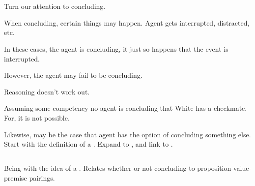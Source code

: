 \chapter{}
\label{cha:zS:sec:curbs}

\begin{note}
  Turn our attention to concluding.

  When concluding, certain things may happen.
  Agent gets interrupted, distracted, etc.

  In these cases, the agent is concluding, it just so happens that the event is interrupted.

  However, the agent may fail to be concluding.

  Reasoning doesn't work out.

  Assuming some competency no agent is concluding that White has a checkmate.
  For, it is not possible.

  Likewise, may be the case that agent has the option of concluding something else.
  Start with the definition of a \bCurb{}.
  Expand to \curb{}, and link  to .
\end{note}

\section{}
\label{sec:bCurb}

\begin{note}
  Being with the idea of a \bCurb{}.
  Relates whether or not concluding to proposition-value-premise pairings.
\end{note}


